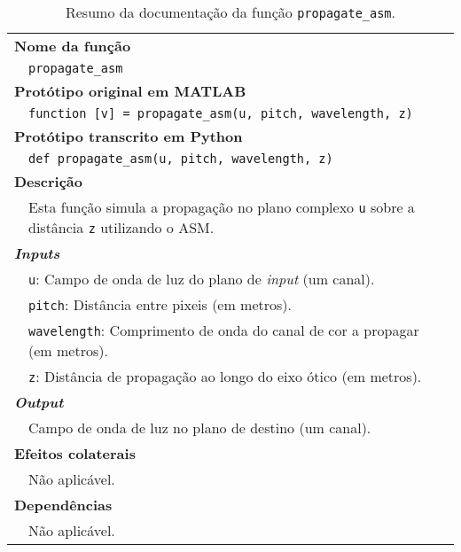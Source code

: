 \begin{table}[!htbp]
    \centering
    \caption{Resumo da documentação da função \texttt{propagate\_asm}.}
    \label{tab:propagate_asm}
    \begin{tabular}{p{1cm} p{10cm}}
        \hline
        \multicolumn{2}{l}{\bfseries Nome da função}\\
         & \verb|propagate_asm|\\
        \hline
        \multicolumn{2}{l}{\bfseries Protótipo original em MATLAB}\\
         & \texttt{function [v] = propagate_asm(u, pitch, wavelength, z)}\\
        \hline
        \multicolumn{2}{l}{\bfseries Protótipo transcrito em Python}\\
         & \texttt{def propagate_asm(u, pitch, wavelength, z)} \\
        \hline\multicolumn{2}{l}{\bfseries Descrição}\\
         & Esta função simula a propagação no plano complexo \verb|u| sobre a distância \verb|z| utilizando o \ac{ASM}.\\
        \hline\multicolumn{2}{l}{\bfseries \textit{Inputs}}\\
         & \verb|u|: Campo de onda de luz do plano de \textit{input} (um canal).\\
         & \verb|pitch|: Distância entre pixeis (em metros).\\
         & \verb|wavelength|: Comprimento de onda do canal de cor a propagar (em metros).\\
         & \verb|z|: Distância de propagação ao longo do eixo ótico (em metros).\\
        \hline\multicolumn{2}{l}{\bfseries \textit{Output}}\\
         & Campo de onda de luz no plano de destino (um canal).\\
        \hline\multicolumn{2}{l}{\bfseries Efeitos colaterais}\\
         & Não aplicável. \\
        \hline\multicolumn{2}{l}{\bfseries Dependências}\\
         & Não aplicável. \\
        \hline
    \end{tabular}
\end{table}




